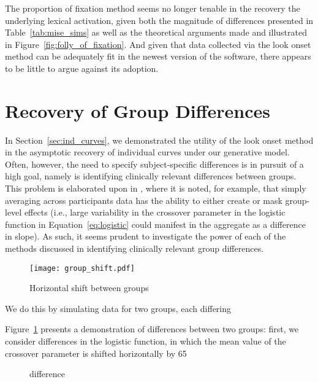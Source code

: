 The proportion of fixation method seems no longer tenable in the recovery the underlying lexical activation, given both the magnitude of differences presented in Table~\ref{tab:mise_sims} as well as the theoretical arguments made and illustrated in Figure~\ref{fig:folly_of_fixation}. And given that data collected via the look onset method can be adequately fit in the newest version of the  software, there appears to be little to argue against its adoption.


\section{Recovery of Group Differences}

In Section~\ref{sec:ind_curves}, we demonstrated the utility of the look onset method in the asymptotic recovery of individual curves under our generative model. Often, however, the need to specify subject-specific differences is in pursuit of a high goal, namely is identifying clinically relevant differences between groups. This problem is elaborated upon in \citet{mcmurray2010individual}, where it is noted, for example, that simply averaging across participants data has the ability to either create or mask group-level effects (i.e., large variability in the crossover parameter in the logistic function in Equation~\ref{eq:logistic} could manifest in the aggregate as a difference in slope). As such, it seems prudent to investigate the power of each of the methods discussed in identifying  clinically relevant group differences. 

\begin{figure}[H]
\centering
\texttt{[image: group\_shift.pdf]}
\caption{Horizontal shift between groups}
\label{fig:group_shift}
\end{figure}

We do this by simulating data for two groups, each differing 

Figure~\ref{fig:group_shift} presents a demonstration of differences between two groups: first, we consider differences in the logistic function, in which the mean value of the crossover parameter is shifted horizontally by 65

\begin{figure}[H]
    \centering
    \caption{difference }
\label{fig:difference_between_shift}
\end{figure}

